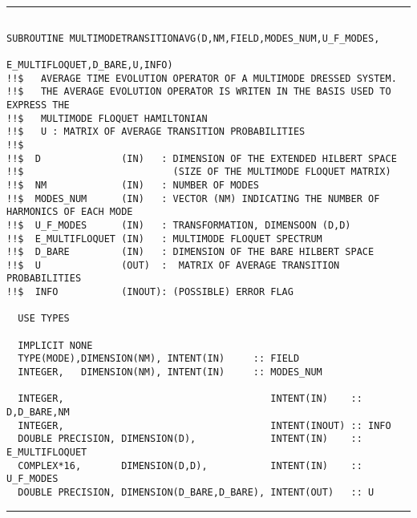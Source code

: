 \documentclass[10pt,a4paper]{article}
\begin{document}
\begin{center}
\rule{12cm}{1pt}
\end{center}
\begin{verbatim}

SUBROUTINE MULTIMODETRANSITIONAVG(D,NM,FIELD,MODES_NUM,U_F_MODES,
                                              E_MULTIFLOQUET,D_BARE,U,INFO) 
!!$   AVERAGE TIME EVOLUTION OPERATOR OF A MULTIMODE DRESSED SYSTEM. 
!!$   THE AVERAGE EVOLUTION OPERATOR IS WRITEN IN THE BASIS USED TO EXPRESS THE 
!!$   MULTIMODE FLOQUET HAMILTONIAN
!!$   U : MATRIX OF AVERAGE TRANSITION PROBABILITIES
!!$
!!$  D              (IN)   : DIMENSION OF THE EXTENDED HILBERT SPACE 
!!$                          (SIZE OF THE MULTIMODE FLOQUET MATRIX)
!!$  NM             (IN)   : NUMBER OF MODES            
!!$  MODES_NUM      (IN)   : VECTOR (NM) INDICATING THE NUMBER OF HARMONICS OF EACH MODE
!!$  U_F_MODES      (IN)   : TRANSFORMATION, DIMENSOON (D,D) 
!!$  E_MULTIFLOQUET (IN)   : MULTIMODE FLOQUET SPECTRUM
!!$  D_BARE         (IN)   : DIMENSION OF THE BARE HILBERT SPACE
!!$  U              (OUT)  :  MATRIX OF AVERAGE TRANSITION PROBABILITIES
!!$  INFO           (INOUT): (POSSIBLE) ERROR FLAG

  USE TYPES

  IMPLICIT NONE
  TYPE(MODE),DIMENSION(NM), INTENT(IN)     :: FIELD
  INTEGER,   DIMENSION(NM), INTENT(IN)     :: MODES_NUM

  INTEGER,                                    INTENT(IN)    :: D,D_BARE,NM 
  INTEGER,                                    INTENT(INOUT) :: INFO
  DOUBLE PRECISION, DIMENSION(D),             INTENT(IN)    :: E_MULTIFLOQUET 
  COMPLEX*16,       DIMENSION(D,D),           INTENT(IN)    :: U_F_MODES   
  DOUBLE PRECISION, DIMENSION(D_BARE,D_BARE), INTENT(OUT)   :: U           

\end{verbatim}
\begin{center}
\rule{12cm}{1pt}
\end{center}
\end{document}
